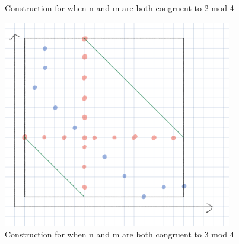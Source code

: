 \documentclass[10pt]{../usamts}
\begin{document}
\begin{solution}
\begin{figure}[h!]
    \caption{Construction for when n and m are both congruent to 2 mod 4}
\end{figure}
\begin{figure}[h!]
    \includegraphics[width=10cm]{round2/p5construct/construct_7_11.png}
    \caption{Construction for when n and m are both congruent to 3 mod 4}
\end{figure}


\end{solution}
\end{document}
